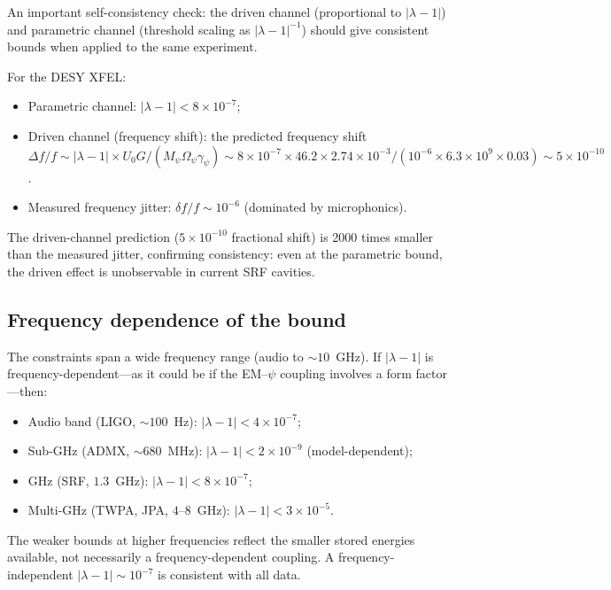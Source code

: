 \documentclass[12pt,aps,prd,twocolumn,superscriptaddress,nofootinbib]{revtex4-2}
\newcommand{\Opsi}{\Omega_\psi}
\newcommand{\gpsi}{\gamma_\psi}
\newcommand{\Mpsi}{M_\psi}
\begin{document}
An important self-consistency check: the driven channel (proportional
to $|\lambda-1|$) and parametric channel (threshold scaling as
$|\lambda-1|^{-1}$) should give consistent bounds when applied
to the same experiment.

For the DESY XFEL:
\begin{itemize}[noitemsep]
\item Parametric channel: $|\lambda-1| < 8\times10^{-7}$;
\item Driven channel (frequency shift): the predicted frequency
shift $\Delta f/f \sim |\lambda-1|\times U_0 G/(\Mpsi\Opsi\gpsi)
\sim 8\times10^{-7}\times46.2\times2.74\times10^{-3}/
(10^{-6}\times6.3\times10^9\times0.03)
\sim 5\times10^{-10}$.
\item Measured frequency jitter: $\delta f/f \sim 10^{-6}$
(dominated by microphonics).
\end{itemize}

The driven-channel prediction ($5\times10^{-10}$ fractional shift)
is 2000 times smaller than the measured jitter, confirming
consistency: even at the parametric bound, the driven effect is
unobservable in current SRF cavities.

\subsection{Frequency dependence of the bound}

The constraints span a wide frequency range (audio to
$\sim10$~GHz).  If $|\lambda-1|$ is frequency-dependent---as it
could be if the EM--$\psi$ coupling involves a form factor---then:
\begin{itemize}[noitemsep]
\item Audio band (LIGO, $\sim100$~Hz): $|\lambda-1| < 4\times10^{-7}$;
\item Sub-GHz (ADMX, $\sim680$~MHz): $|\lambda-1| < 2\times10^{-9}$
(model-dependent);
\item GHz (SRF, $1.3$~GHz): $|\lambda-1| < 8\times10^{-7}$;
\item Multi-GHz (TWPA, JPA, $4$--$8$~GHz): $|\lambda-1| < 3\times10^{-5}$.
\end{itemize}

The weaker bounds at higher frequencies reflect the smaller stored
energies available, not necessarily a frequency-dependent coupling.
A frequency-independent $|\lambda-1| \sim 10^{-7}$ is consistent
with all data.


\end{document}
